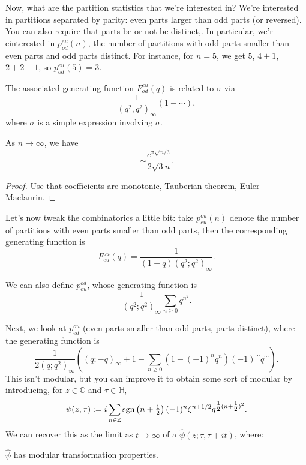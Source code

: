 \documentclass[reqno]{amsart} 
\begin{document}
Now, what are the partition statistics that we're interested in?  We're interested in partitions separated by parity: even parts larger than odd parts (or reversed).  You can also require that parts be or not be distinct,.  In particular, we'r einterested in $p_{o d}^{e u}(n)$, the number of partitions with odd parts smaller than even parts and odd parts distinct.  For instance, for $n = 5$, we get $5$, $4 + 1$, $2 + 2 + 1$, so $p_{o d}^{e u}(5) = 3$.

The associated generating function $F_{o d}^{e u}(q)$ is related to $\sigma$ via
\begin{equation*}
  \frac{1}{(q^2, q^2)_\infty} \left( 1 - \dotsb \right),
\end{equation*}
where $\sigma$ is a simple expression involving $\sigma$.

\begin{theorem}
  As $n \rightarrow \infty$, we have
  \begin{equation*}
    \sim \frac{e^{\pi \sqrt{n/3}}}{2 \sqrt{3} n}.
  \end{equation*}
\end{theorem}
\begin{proof}
  Use that coefficients are monotonic, Tauberian theorem, Euler--Maclaurin.
\end{proof}

Let's now tweak the combinatorics a little bit: take $p_{e u}^{o u}(n)$ denote the number of partitions with even parts smaller than odd parts, then the corresponding generating function is
\begin{equation*}
  F_{e u}^{o u}(q) =   \frac{1}{(1 - q)(q^2 ; q^2)_\infty}.
\end{equation*}

We can also define $p_{e u}^{o d}$, whose generating function is
\begin{equation*}
  \frac{1}{(q^2 ; q^2)_\infty} \sum_{n \geq 0} q^{n^2}.
\end{equation*}

Next, we look at $p_{e d}^{o u}$ (even parts smaller than odd parts, parts distinct), where the generating function is
\begin{equation*}
  \frac{1}{2(q; q^2)_\infty}
  \left((q; - q)_\infty + 1 - \sum_{n \geq 0}(1 -(- 1)^n q^n )(- 1)^{\dotsb} q^{\dotsb} \right).
\end{equation*}
This isn't modular, but you can improve it to obtain some sort of modular by introducing, for $z \in \mathbb{C}$ and $\tau \in \mathbb{H}$,
\begin{equation*}
  \psi(z, \tau) := i \sum_{n \in \mathbb{Z}} \operatorname{sgn} \left( n + \tfrac{1}{2} \right)(- 1)^n
  \zeta^{n + 1/2} q^{\tfrac{1}{2}(n + \tfrac{1}{2})^2}.
\end{equation*}
We can recover this as the limit as $t \rightarrow \infty$ of a $\hat{\psi}(z; \tau, \tau + i t)$, where:
\begin{theorem}[B.--Nazaroglu]
  $\hat{\psi}$ has modular transformation properties.
\end{theorem}
\end{document}
